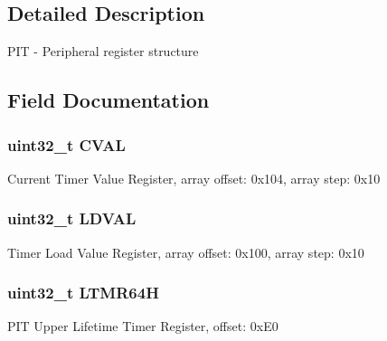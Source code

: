 \subsection{Detailed Description}
P\+I\+T -\/ Peripheral register structure 

\subsection{Field Documentation}
\hypertarget{struct_p_i_t___mem_map_af56425bca4f0078ab391a3e623073ce1}{}
\subsubsection[{C\+V\+A\+L}]{\setlength{\rightskip}{0pt plus 5cm}uint32\+\_\+t C\+V\+A\+L}\label{struct_p_i_t___mem_map_af56425bca4f0078ab391a3e623073ce1}
Current Timer Value Register, array offset\+: 0x104, array step\+: 0x10 \hypertarget{struct_p_i_t___mem_map_adffd273f683cea4a7f0aecbf45b2ea84}{}
\subsubsection[{L\+D\+V\+A\+L}]{\setlength{\rightskip}{0pt plus 5cm}uint32\+\_\+t L\+D\+V\+A\+L}\label{struct_p_i_t___mem_map_adffd273f683cea4a7f0aecbf45b2ea84}
Timer Load Value Register, array offset\+: 0x100, array step\+: 0x10 \hypertarget{struct_p_i_t___mem_map_a2da67bf5ea0ee321d9a89500436061c6}{}
\subsubsection[{L\+T\+M\+R64\+H}]{\setlength{\rightskip}{0pt plus 5cm}uint32\+\_\+t L\+T\+M\+R64\+H}\label{struct_p_i_t___mem_map_a2da67bf5ea0ee321d9a89500436061c6}
P\+I\+T Upper Lifetime Timer Register, offset\+: 0x\+E0 \hypertarget{struct_p_i_t___mem_map_ab3f43f5df1b7776759e6497948c4e17f}{}
